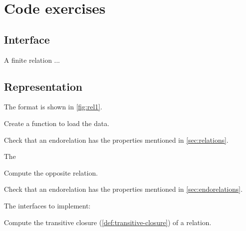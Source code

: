\section{Code exercises}

\subsection*{Interface}

A finite relation  ...


\subsection*{Representation}{}

The format is shown in \cref{fig:rel1}.


\begin{gradedexercise}
  Create a function to load the data.


%

\end{gradedexercise}


%  

\begin{gradedexercise}

  Check that an endorelation has the properties mentioned in \cref{sec:relations}.

  The

\end{gradedexercise}




\begin{gradedexercise}[Opposite]
  Compute the opposite relation.


\end{gradedexercise}

\begin{gradedexercise}

  Check that an endorelation has the properties mentioned in \cref{sec:endorelations}.

  The interfaces to implement:

\end{gradedexercise}

\begin{gradedexercise}
  Compute the transitive closure (\cref{def:transitive-closure}) of a relation.


\end{gradedexercise}
